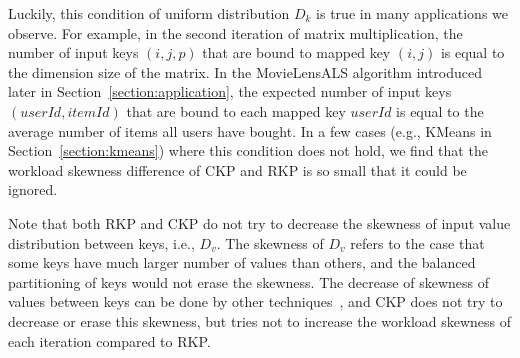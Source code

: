 \documentclass[10pt,journal,compsoc]{IEEEtran}
\begin{document}

Luckily, this condition of uniform distribution $D_k$ is true in many applications we observe.
For example, in the second iteration of matrix multiplication, 
the number of input keys $(i,j,p)$ that
are bound to mapped key $(i,j)$ is equal to the dimension size of the matrix.
In the MovieLensALS algorithm introduced later in Section~\ref{section:application}, the expected number of input keys $(userId, itemId)$
that are bound to each mapped key $userId$ is equal to the average number of
items all users have bought.
In a few cases (e.g., KMeans in Section~\ref{section:kmeans}) where
this condition does not hold,
we find that the workload skewness difference of CKP and RKP is so small
that it could be ignored.%

Note that both RKP and CKP do not try to decrease the skewness of
input value distribution between keys, i.e., $D_v$.
The skewness of $D_v$ refers to the case that some keys have much larger 
number of values than others, and the balanced partitioning of keys 
would not erase the skewness. 
The decrease of skewness of values between keys can be done by other 
techniques~\cite{kwon2010skew, kwon2012skewtune}, 
and CKP does not try to decrease or erase this skewness, but tries not to 
increase the workload skewness of each iteration compared to RKP. 

\end{document}
